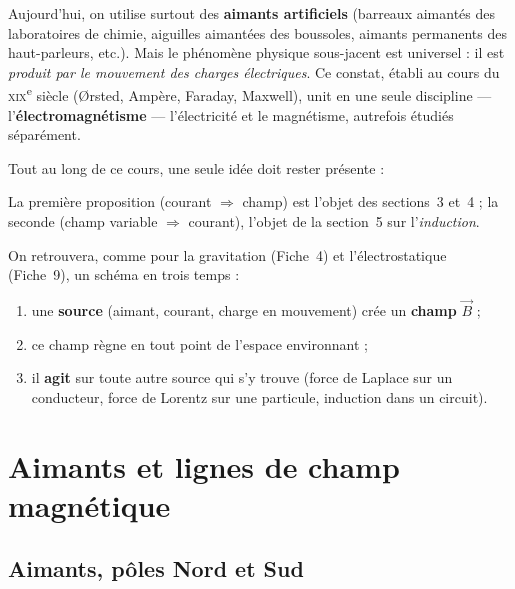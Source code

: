 \documentclass[11pt,a4paper]{article}
\newcommand{\Bvec}{\vec{B}}
\begin{document}
Aujourd'hui, on utilise surtout des \textbf{aimants artificiels} (barreaux aimantés des laboratoires
de chimie, aiguilles aimantées des boussoles, aimants permanents des haut-parleurs, etc.). Mais le
phénomène physique sous-jacent est universel : il est \emph{produit par le mouvement des charges
électriques}. Ce constat, établi au cours du \textsc{xix}\textsuperscript{e} siècle (Ørsted, Ampère,
Faraday, Maxwell), unit en une seule discipline — l'\textbf{électromagnétisme} — l'électricité et le
magnétisme, autrefois étudiés séparément.

\begin{remarque}
Tout au long de ce cours, une seule idée doit rester présente :
\begin{center}
\end{center}
La première proposition (courant $\Rightarrow$ champ) est l'objet des sections~3 et~4 ; la
seconde (champ variable $\Rightarrow$ courant), l'objet de la section~5 sur l'\emph{induction}.
\end{remarque}

On retrouvera, comme pour la gravitation (Fiche~4) et l'électrostatique (Fiche~9), un schéma en
trois temps :
\begin{enumerate}[leftmargin=1.8em,topsep=2pt]
  \item une \textbf{source} (aimant, courant, charge en mouvement) crée un \textbf{champ} $\Bvec$ ;
  \item ce champ règne en tout point de l'espace environnant ;
  \item il \textbf{agit} sur toute autre source qui s'y trouve (force de Laplace sur un conducteur,
        force de Lorentz sur une particule, induction dans un circuit).
\end{enumerate}

\section{Aimants et lignes de champ magnétique}

\subsection{Aimants, pôles Nord et Sud}
\end{document}
